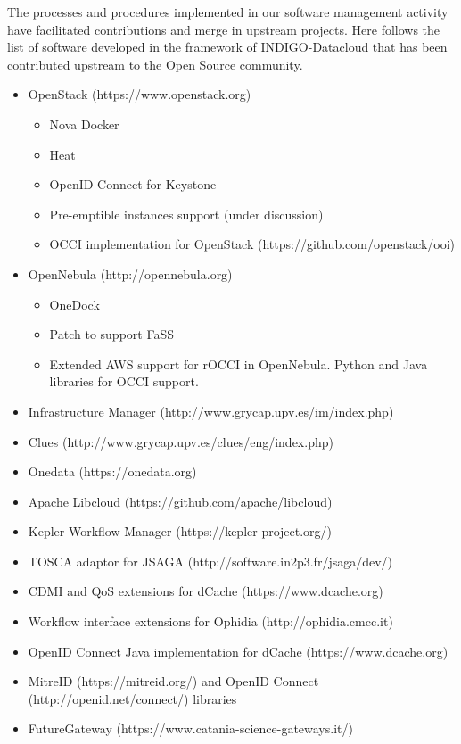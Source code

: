 \documentclass{article}
\begin{document}
The processes and procedures implemented in our software management activity have facilitated contributions and merge in upstream projects.
Here follows the list of software developed in the framework of INDIGO-Datacloud that has been contributed upstream to the Open Source community.


\begin{itemize}

\item OpenStack (https://www.openstack.org) 
\begin{itemize}
\item Nova Docker
\item Heat
\item OpenID-Connect for Keystone
\item Pre-emptible instances support (under discussion)
\item OCCI implementation for OpenStack (https://github.com/openstack/ooi) 
\end{itemize}
\item OpenNebula (http://opennebula.org) 
\begin{itemize}
\item OneDock
\item Patch to support FaSS
\item Extended AWS support for rOCCI in OpenNebula. Python and Java libraries for OCCI support.
\end{itemize}
\item Infrastructure Manager (http://www.grycap.upv.es/im/index.php)
\item Clues (http://www.grycap.upv.es/clues/eng/index.php)
\item Onedata (https://onedata.org) 
\item Apache Libcloud (https://github.com/apache/libcloud)
\item Kepler Workflow Manager (https://kepler-project.org/)

\item TOSCA adaptor for JSAGA (http://software.in2p3.fr/jsaga/dev/) 

\item CDMI and QoS extensions for dCache (https://www.dcache.org) 
\item Workflow interface extensions for Ophidia (http://ophidia.cmcc.it) 
\item OpenID Connect Java implementation for dCache (https://www.dcache.org) 
\item MitreID (https://mitreid.org/) and OpenID Connect (http://openid.net/connect/) libraries
\item FutureGateway (https://www.catania-science-gateways.it/)

\end{itemize}
\end{document}
